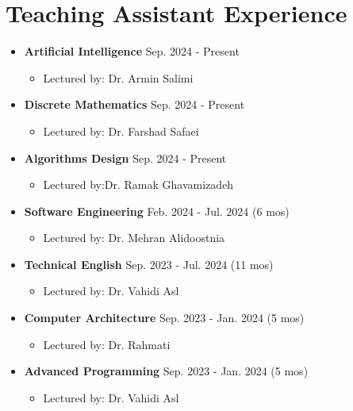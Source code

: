 \documentclass[11pt,a4paper,sans]{moderncv}        %
\begin{document}
\section{Teaching Assistant Experience}
\begin{itemize}

    \item \textbf{Artificial Intelligence } \hfill Sep. 2024 - Present
\begin{itemize}
        \item Lectured by: Dr. Armin Salimi

    \end{itemize}
\item \textbf{Discrete Mathematics } \hfill Sep. 2024 - Present
\begin{itemize}
        \item Lectured by: Dr. Farshad Safaei


    \end{itemize}

\item \textbf{Algorithms Design } \hfill Sep. 2024 - Present
\begin{itemize}
        \item Lectured by:Dr. Ramak Ghavamizadeh


    \end{itemize}
    \item \textbf{Software Engineering } \hfill Feb. 2024 - Jul. 2024 (6 mos)
    \begin{itemize}
        \item Lectured by: Dr. Mehran Alidoostnia
    \end{itemize}

    \item \textbf{Technical English} \hfill Sep. 2023 - Jul. 2024 (11 mos)
    \begin{itemize}
        \item Lectured by: Dr. Vahidi Asl

    \end{itemize}

    \item \textbf{Computer Architecture} \hfill Sep. 2023 - Jan. 2024 (5 mos)
    \begin{itemize}
        \item Lectured by: Dr. Rahmati
    \end{itemize}

    \item \textbf{Advanced Programming} \hfill Sep. 2023 - Jan. 2024 (5 mos)
    \begin{itemize}
        \item Lectured by: Dr. Vahidi Asl
    \end{itemize}


\end{itemize}
\end{document}
